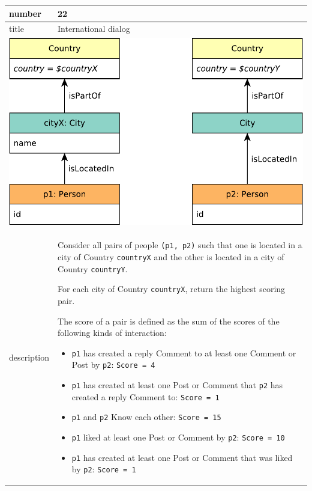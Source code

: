 \renewcommand*{\arraystretch}{1.1}

\noindent\begin{tabularx}{17cm}{|p{1.95cm}|X|}
	\hline
	number      & 22                                                          \\ \hline
%
	title       & International dialog                                                           \\ \hline
	\multicolumn{2}{|c|}{ \includegraphics[scale=\patternscale,margin=0cm .2cm]{patterns/q22}} \\ \hline
	description & Consider all pairs of people \texttt{(p1,\ p2)} such that one is located
in a city of Country \texttt{countryX} and the other is located in a
city of Country \texttt{countryY}.

For each city of Country \texttt{countryX}, return the highest scoring
pair.

The score of a pair is defined as the sum of the scores of the following
kinds of interaction:

\begin{itemize}
\tightlist
\item
  \texttt{p1} has created a reply Comment to at least one Comment or
  Post by \texttt{p2}: \texttt{Score\ =\ 4}
\item
  \texttt{p1} has created at least one Post or Comment that \texttt{p2}
  has created a reply Comment to: \texttt{Score\ =\ 1}
\item
  \texttt{p1} and \texttt{p2} Know each other: \texttt{Score\ =\ 15}
\item
  \texttt{p1} liked at least one Post or Comment by \texttt{p2}:
  \texttt{Score\ =\ 10}
\item
  \texttt{p1} has created at least one Post or Comment that was liked by
  \texttt{p2}: \texttt{Score\ =\ 1}
\end{itemize}


\end{tabularx}
